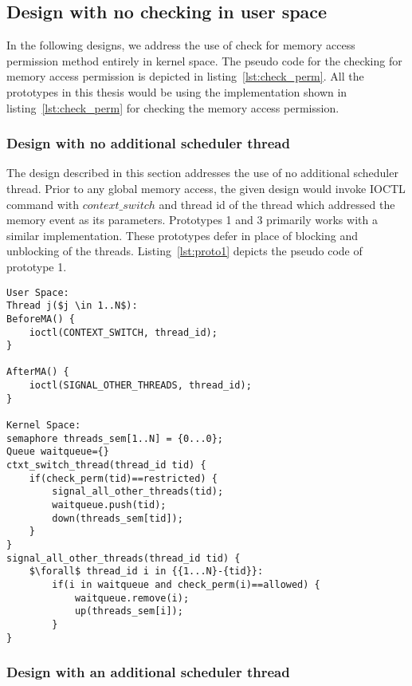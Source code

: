 \subsection{Design with no checking in user space \label{nocheck}}

In the following designs, we address the use of check for memory access  permission method entirely in kernel space. 
The pseudo code for the checking for memory access permission is depicted in listing~\ref{lst:check_perm}. 
All the prototypes in this thesis would be using the implementation shown in listing~\ref{lst:check_perm} for checking the memory access permission.

\subsubsection{Design with no additional scheduler thread} \label{no_check_no_add}

The design described in this section addresses the use of no additional scheduler thread. 
Prior to any global memory access, the given design would invoke IOCTL command with $context\_switch$ and thread id of the thread which addressed the memory event as its parameters. 
Prototypes 1 and 3 primarily works with a similar implementation. 
These prototypes defer in place of blocking and unblocking of the threads. 
Listing~\ref{lst:proto1} depicts the pseudo code of prototype 1.
\newpage
\begin{lstlisting}[mathescape=true,caption={Pseudo Code for Prototype 1}, style=customc,frame=tlrb,label={lst:proto1}]
User Space:
Thread j($j \in 1..N$):
BeforeMA() {	
	ioctl(CONTEXT_SWITCH, thread_id);	
}

AfterMA() {	
	ioctl(SIGNAL_OTHER_THREADS, thread_id);
}

Kernel Space:
semaphore threads_sem[1..N] = {0...0};
Queue waitqueue={}
ctxt_switch_thread(thread_id tid) {	
	if(check_perm(tid)==restricted) {
		signal_all_other_threads(tid);
		waitqueue.push(tid);
		down(threads_sem[tid]); 
	}
}
signal_all_other_threads(thread_id tid) {
	$\forall$ thread_id i in {{1...N}-{tid}}:
		if(i in waitqueue and check_perm(i)==allowed) {
			waitqueue.remove(i);
			up(threads_sem[i]);
		}
}

\end{lstlisting}

\subsubsection{Design with an additional scheduler thread}\label{sec_add_thread}

